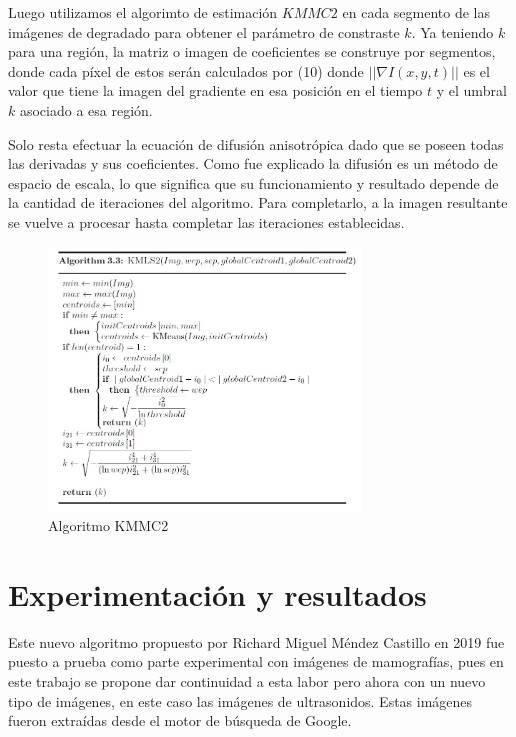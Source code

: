 \documentclass[a4paper,10pt,twocolumn]{article}
\begin{document}
Luego utilizamos el algorimto de estimaci\'on $KMMC2$ en cada segmento de las im\'agenes de degradado para obtener el par\'ametro de constraste $k$. Ya teniendo $k$ para una regi\'on, la matriz o imagen de coeficientes se construye por segmentos, donde cada p\'ixel de estos ser\'an calculados por (10) donde $||\nabla I(x,y,t)||$ es el valor que tiene la imagen del gradiente en esa posici\'on en el tiempo $t$ y el umbral $k$ asociado a esa regi\'on.

Solo resta efectuar la ecuaci\'on de difusi\'on anisotr\'opica dado que se poseen todas las derivadas y sus coeficientes. Como fue explicado la difusi\'on es un m\'etodo de espacio de escala, lo que significa que su funcionamiento y resultado depende de la cantidad de iteraciones del algoritmo. Para completarlo, a la imagen resultante se vuelve a procesar hasta completar las iteraciones establecidas.

\begin{figure}[htb]
	\begin{center}
		\includegraphics[width=8.3cm]{image/Alg3}
	\end{center}
	\caption{Algoritmo KMMC2 \label{fig:kmmc2}}
\end{figure}


\section{Experimentaci\'{o}n y resultados}\label{sec:experimentacion_resultados}

Este nuevo algoritmo propuesto por Richard Miguel M\'endez Castillo en 2019 \cite{richard} fue puesto a prueba como parte experimental con im\'agenes de mamograf\'ias, pues en este trabajo se propone dar continuidad a esta labor pero ahora con un nuevo tipo de im\'agenes, en este caso las im\'agenes de ultrasonidos. Estas im\'agenes fueron extra\'idas desde el motor de b\'usqueda de Google.
\end{document}
